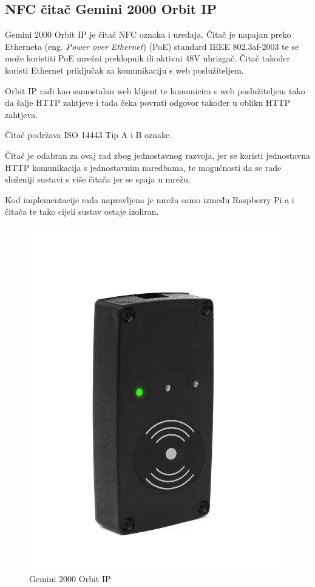 \documentclass[times, utf8, zavrsni]{fer}
\begin{document}
\subsection{NFC čitač Gemini 2000 Orbit IP}
Gemini 2000 Orbit IP \citep{11} je čitač NFC oznaka i uređaja. Čitač je napajan preko Etherneta (eng. \textit{Power over Ethernet}) (PoE) standard IEEE 802.3af-2003 te se može koristiti PoE mrežni preklopnik ili aktivni 48V ubrizgač. Čitač također koristi Ethernet priključak za komunikaciju s web poslužiteljem. \par
Orbit IP radi kao samostalan web klijent te komunicira s web poslužiteljem tako da šalje HTTP zahtjeve i tada čeka povrati odgovor također u obliku HTTP zahtjeva. \par 
Čitač podržava ISO 14443 Tip A i B oznake.\par 
Čitač je odabran za ovaj rad zbog jednostavnog razvoja, jer se koristi jednostavna HTTP komunikacija s jednostavnim naredbama, te mogućnosti da se rade složeniji sustavi s više čitača jer se spaja u mrežu.\par
Kod implementacije rada napravljena je mreža samo između Raspberry Pi-a i čitača te tako cijeli sustav ostaje izoliran.


\begin{figure}[H]
\includegraphics[scale=0.2]{orbit.jpg}
\centering
\caption{Gemini 2000 Orbit IP \citep{16}}
\centering
\end{figure}
\end{document}
